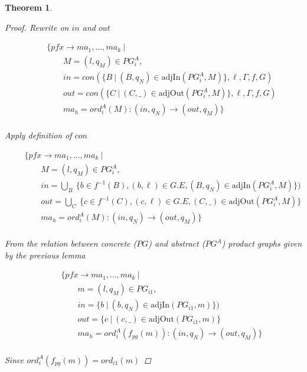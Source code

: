 \documentclass[twocolumn, openany]{sig-alternate-10pt}
\newtheorem{thm}{Theorem}
\begin{document}
\begin{thm}
\begin{proof}
  Rewrite on $in$ and $out$

  \[ \begin{array}{l}
     ~~~~~~~~~ \{ pfx \rightarrow ma_1, \dots, ma_k ~\vert~ \\
     ~~~~~~~~~~~~~~~~~~ M = (l,q_M) \in PG^A_i, \\
     ~~~~~~~~~~~~~~~~~~ in = con(\{ B ~\vert~ (B,q_N) \in \text{adjIn}(PG^A_i,M) \},\ell,\Gamma,f,G) \\
     ~~~~~~~~~~~~~~~~~~ out = con(\{ C ~\vert~ (C,\_) \in \text{adjOut}(PG^A_i,M) \},\ell,\Gamma,f,G) \\
     ~~~~~~~~~~~~~~~~~~ ma_h = ord^A_i(M) : (in,q_N) \rightarrow (out,q_M) \} \\
  \end{array} \]%

  Apply definition of $con$

  \[ \begin{array}{l}
     ~~~~~~~~~ \{ pfx \rightarrow ma_1, \dots, ma_k ~\vert~ \\
     ~~~~~~~~~~~~~~~~~~ M = (l,q_M) \in PG^A_i, \\
     ~~~~~~~~~~~~~~~~~~ in = \bigcup_B~ \{ b \in f^{-1}(B), (b,\ell) \in G.E, (B,q_N) \in \text{adjIn}(PG^A_i,M) \}) \\
     ~~~~~~~~~~~~~~~~~~ out = \bigcup_C~ \{ c \in f^{-1}(C), (c,\ell) \in G.E, (C,\_) \in \text{adjOut}(PG^A_i,M) \} \\
     ~~~~~~~~~~~~~~~~~~ ma_h = ord^A_i(M) : (in,q_N) \rightarrow (out,q_M) \} \\
  \end{array} \]%

  From the relation between concrete ($PG$) and abstract ($PG^A$) product graphs given by the previous lemma

  \[ \begin{array}{l}
     ~~~~~~~~~ \{ pfx \rightarrow ma_1, \dots, ma_k ~\vert~ \\
     ~~~~~~~~~~~~~~~~~~ m = (l,q_M) \in PG_{i1}, \\
     ~~~~~~~~~~~~~~~~~~ in = \{ b ~\vert~ (b,q_N) \in \text{adjIn}(PG_{i1},m) \}) \\
     ~~~~~~~~~~~~~~~~~~ out = \{ c ~\vert~ (c,\_) \in \text{adjOut}(PG_{i1},m) \} \\
     ~~~~~~~~~~~~~~~~~~ ma_h = ord^A_i(f_{pg}(m)) : (in,q_N) \rightarrow (out,q_M) \} \\
  \end{array} \]%

  Since $ord^A_i(f_{pg}(m)) = ord_{i1}(m)$


\end{proof}
\end{thm}
\end{document}
